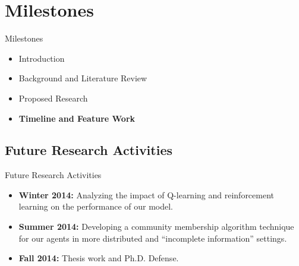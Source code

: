 \documentclass{beamer}
\begin{document}
\section{Milestones}
\begin{frame}{Milestones}
    \begin{itemize}
     	\itemsep=.5cm
    	\item Introduction
    	\item Background and Literature Review
    	\item Proposed Research
    	\item {\bf Timeline and Feature Work}
    \end{itemize}
\end{frame}

\subsection{Future Research Activities}
\begin{frame}{Future Research Activities}
    \begin{itemize}

    \item \textbf{Winter 2014: }Analyzing the impact of Q-learning and reinforcement
    learning on the performance of our model.

    \item \textbf{Summer 2014: }Developing a community membership algorithm technique for
    our agents in more distributed and ``incomplete information'' settings.

    \item \textbf{Fall 2014: }Thesis work and Ph.D. Defense.
    \end{itemize}
\end{frame}
\end{document}
